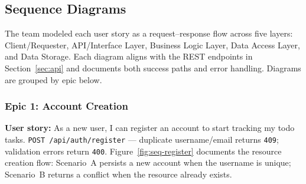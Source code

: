 \subsection{Sequence Diagrams}\label{sec:seq-diagrams}
The team modeled each user story as a request--response flow across five layers: Client/Requester,
API/Interface Layer, Business Logic Layer, Data Access Layer, and Data Storage. Each diagram aligns
with the REST endpoints in Section~\ref{sec:api} and documents both success paths and error handling.
Diagrams are grouped by epic below.

\newpage
\subsubsection{Epic 1: Account Creation}
\textbf{User story:} As a new user, I can register an account to start tracking my todo tasks.
\newline
\texttt{POST /api/auth/register} --- duplicate username/email returns \texttt{409}; validation errors return \texttt{400}.
Figure~\ref{fig:seq-register} documents the resource creation flow: Scenario~A persists a new account when
the username is unique; Scenario~B returns a conflict when the resource already exists.

